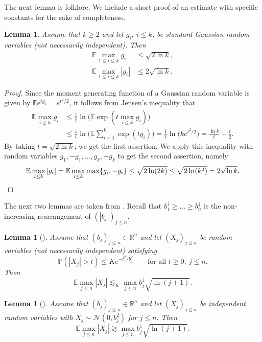 \documentclass[a4paper]{amsart}
\newtheorem{lemma}[theorem]{Lemma}
\theoremstyle{definition}
\theoremstyle{remark}
\numberwithin{equation}{section}
\newcommand*{\RR}{\mathbb{R}}
\newcommand*{\EE}{\mathbb{E}}
\newcommand*{\PP}{\mathbb{P}}
\newcommand*{\rearr}{\downarrow} %
\begin{document}
The next lemma is folklore.
We include a short proof of an estimate with specific constants
for the sake of completeness.




\begin{lemma}
	\label{lem:max-Gaussians}
Assume that $k\ge 2$ and let $g_i$,  $i\le k$, be standard Gaussian random variables (not necessarily independent).
Then
\begin{align*}
\EE \max_{1\leq i\leq k} g_i &\leq \sqrt{2 \ln k},\\
\EE \max_{1\leq i\leq k} |g_i| &\leq 2\sqrt{ \ln k}.
\end{align*}
\end{lemma}


\begin{proof}
Since the moment generating function of a Gaussian random variable is given by $\EE e^{tg_1} = e^{t^2/2}$, it follows from Jensen's inequality that
\begin{align*}
	\EE \max_{i\le k} g_i &\le  \frac 1t \ln\bigl( \EE \exp(t\max_{i\le k } g_i) \bigr)\\
	& \le \frac 1t \ln\bigl(\EE \sum_{i=1}^k \exp(t g_i)\bigr)
	=  \frac 1t \ln\bigl(k e^{t^2/2}\bigr)
	= \frac{\ln k}t +\frac t2.
\end{align*}
By taking $t=\sqrt{2\ln k}$, we get the first assertion.
We apply this inequality with random variables $g_1, -g_1, \ldots, g_k, -g_k$ to get the second assertion, namely
\[
	\EE\max_{i\le k}|g_i| = \EE \max_{i\le k} \max\{g_i, -g_i\}\le\sqrt{2\ln(2k)} \le\sqrt{2\ln(k^2)}=2\sqrt{\ln k}.\qedhere
\]
\end{proof}

The next two lemmas are taken from \cite{vH2017}. Recall that $b_1^{\rearr{}} \geq \ldots \geq b_n^{\rearr{}}$ is the non-increasing rearrangement of $(|b_j|)_{j\le n}$.

\begin{lemma}[{\cite[Lemma~2.3]{vH2017}}]	\label{lem:vH2017-3}
	Assume that $(b_j)_{j\le n}\in\RR^n$ and let $(X_j)_{j\le n}$ be random variables (not necessarily independent) satisfying
	\[
		\PP(|X_j|>t)\le Ke^{-t^2/b_j^2} \qquad \text{for all } t\ge 0,\ j\le n.
	\]
	Then
	\[
		\EE \max_{j\le n} |X_j| \lesssim_{K} \max_{j\le n} b_j^{\rearr{}} \sqrt{\ln(j+1)}.
	\]
	\end{lemma}

\begin{lemma}[{\cite[Lemma~2.4]{vH2017}}]	\label{lem:vH2017-4}
	Assume that $(b_j)_{j\le n}\in\RR^n$ and let $(X_j)_{j\le n}$ be independent random variables with $X_j \sim \mathcal{N}(0,b_j^{2})$ for $j\leq n$. Then
	\[
		\EE \max_{j\le n} |X_j| \gtrsim \max_{j\le n} b_j^{\rearr{}} \sqrt{\ln(j+1)}.
	\]
\end{lemma}
\end{document}

